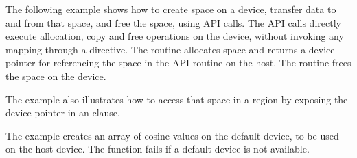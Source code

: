 The following example shows how to create space on a device, transfer data
to and from that space, and free the space, using API calls. The API calls
directly execute allocation, copy and free operations on the device, without invoking
any mapping through a  directive. The  routine allocates space
and returns a device pointer for referencing the space in the 
API routine on the host. The  routine frees the space on the device.

The example also illustrates how to access that space
in a  region by exposing the device pointer in an  clause.

The example creates an array of cosine values on the default device, to be used
on the host device. The function fails if a default device is not available.


